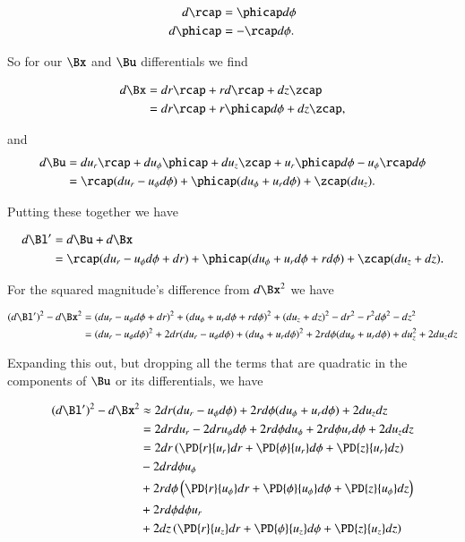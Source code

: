 \begin{align}\label{eqn:continuumL2:430}
d\rcap &= \phicap d\phi \\
d\phicap &= -\rcap d\phi.
\end{align}

So for our $\Bx$ and $\Bu$ differentials we find

\begin{align*}
d\Bx 
&= dr \rcap + r d\rcap + dz \zcap \\
&= dr \rcap + r \phicap d\phi + dz \zcap,
\end{align*}

and
\begin{align*}
d\Bu 
&= du_r \rcap + du_\phi \phicap + du_z \zcap 
+ u_r \phicap d\phi - u_\phi \rcap d\phi \\
&= \rcap( du_r - u_\phi d\phi )
+ \phicap ( du_\phi + u_r d\phi )
+ \zcap ( du_z ).
\end{align*}

Putting these together we have

\begin{align*}
d\Bl' 
&= d\Bu + d\Bx 
\\
&= \rcap( du_r - u_\phi d\phi + dr )
+ \phicap ( du_\phi + u_r d\phi + r d\phi )
+ \zcap ( du_z + dz ).
\end{align*}

For the squared magnitude's difference from $d\Bx^2$ we have

\begin{align*}
(d\Bl')^2 - d\Bx^2
&= 
( du_r - u_\phi d\phi + dr )^2
+ ( du_\phi + u_r d\phi + r d\phi )^2
+ ( du_z + dz )^2
-dr^2 - r^2 d\phi^2 - dz^2 \\
&=
( du_r - u_\phi d\phi )^2 
+ 2 dr ( du_r - u_\phi d\phi )
+ ( du_\phi + u_r d\phi )^2
+ 2 r d\phi ( du_\phi + u_r d\phi )
+ du_z^2 + 2 du_z dz \\
\end{align*}

Expanding this out, but dropping all the terms that are quadratic in the components of $\Bu$ or its differentials, we have

\begin{align*}
(d\Bl')^2 - d\Bx^2
&\approx
  2 dr ( du_r - u_\phi d\phi )
+ 2 r d\phi ( du_\phi + u_r d\phi )
+ 2 du_z dz \\
&=
  2 dr du_r 
- 2 dr u_\phi d\phi 
+ 2 r d\phi du_\phi 
+ 2 r d\phi u_r d\phi 
+ 2 du_z dz 
\\
&=
  2 dr 
\left( 
\PD{r}{u_r} dr
+\PD{\phi}{u_r} d\phi
+\PD{z}{u_r} dz
\right) \\
&- 2 dr d\phi u_\phi  \\
&+ 2 r d\phi 
\left( 
\PD{r}{u_\phi} dr
+\PD{\phi}{u_\phi} d\phi
+\PD{z}{u_\phi} dz
\right) \\
&+ 2 r d\phi d\phi u_r \\
&+ 2 
dz 
\left( 
\PD{r}{u_z} dr
+\PD{\phi}{u_z} d\phi
+\PD{z}{u_z} dz
\right) \\
\end{align*}


